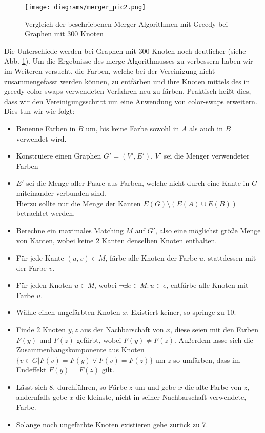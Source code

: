 \documentclass[11pt]{article}
\begin{document}
\begin{figure}
  \texttt{[image: diagrams/merger\_pic2.png]}
  \caption{Vergleich der beschriebenen Merger Algorithmen mit Greedy bei Graphen mit 300 Knoten}
  \label{fig:merge2}
\end{figure}

Die Unterschiede werden bei Graphen mit 300 Knoten noch deutlicher (siehe Abb. \ref{fig:merge2}).
Um die Ergebnisse des merge Algorithmusses zu verbessern haben wir im Weiteren versucht, 
die Farben, welche bei der Vereinigung nicht zusammengefasst werden können,
zu entfärben und ihre Knoten mittels des in greedy-color-swaps verwendeten Verfahren neu zu färben.
Praktisch heißt dies, dass wir den Vereinigungsschritt um eine Anwendung von color-swaps erweitern.
Dies tun wir wie folgt:

\begin{itemize}
\item[1.] Benenne Farben in $B$ um, bis keine Farbe sowohl in $A$ als auch in $B$ verwendet wird.
\item[2.] Konstruiere einen Graphen $G'=(V',E')$, $V'$ sei die Menger verwendeter Farben
\item[3.] $E'$ sei die Menge aller Paare aus Farben, welche nicht durch eine Kante in $G$ miteinander verbunden sind. \\Hierzu sollte nur die Menge der Kanten $E(G)\setminus (E(A)\cup E(B))$ betrachtet werden.
\item[4.] Berechne ein maximales Matching $M$ auf $G'$, also eine möglichst größe Menge von Kanten, wobei keine 2 Kanten denselben Knoten enthalten.
\item[5.] Für jede Kante $(u,v)\in M$, färbe alle Knoten der Farbe $u$, stattdessen mit der Farbe $v$.
\item[6.] Für jeden Knoten $u\in M$, wobei $\neg \exists e\in M : u\in e$, entfärbe alle Knoten mit Farbe $u$.
\item[7.] Wähle einen ungefärbten Knoten $x$. Existiert keiner, so springe zu 10.
\item[8.] Finde 2 Knoten $y,z$ aus der Nachbarschaft von $x$, diese seien mit den Farben $F(y)$ und $F(z)$ gefärbt, wobei $F(y)\neq F(z)$.
Außerdem lasse sich die Zusammenhangskomponente aus Knoten $\{v\in G | F(v)=F(y) \lor F(v)=F(z)\}$ um $z$ so umfärben, dass im Endeffekt $F(y)=F(z)$ gilt.
\item[9.] Lässt sich 8. durchführen, so Färbe $z$ um und gebe $x$ die alte Farbe von $z$, andernfalls gebe $x$ die kleinste, nicht in seiner Nachbarschaft verwendete, Farbe.
\item[10.] Solange noch ungefärbte Knoten existieren gehe zurück zu 7.
\end{itemize}
\end{document}
